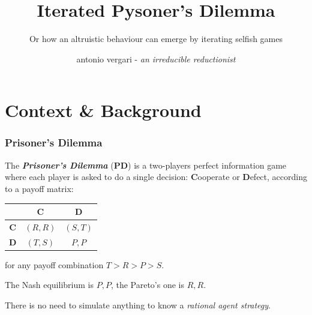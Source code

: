 \documentclass[xcolor={usenames,dvipsnames,svgnames}, compress]{beamer}
\begin{document}
\title{Iterated Pysoner's Dilemma}
\subtitle{Or how an altruistic behaviour can emerge by iterating selfish games}
\author{antonio vergari - \emph{an irreducible reductionist}}

\footnotesize \let\small\footnotesize

{
  \begin{frame}
    \titlepage
  \end{frame}
}

\section{Context \& Background}
{
  \begin{frame}
    \sectionpage
  \end{frame}
}

\begin{frame}
  \frametitle{ Prisoner's Dilemma}
  The \emph{\textbf{Prisoner's Dilemma}} (\textbf{PD}) is a two-players perfect information game where each player is asked to
  do a single decision: \textbf{C}ooperate or \textbf{D}efect,
  according to a payoff matrix:
  \begin{table}[c]
    \centering
    \begin{tabular}[htbp]{c c c}
      & \textbf{C} & \textbf{D} \\
      \midrule
      \textbf{C} & $(R,R)$ & $(S,T)$ \\
      \midrule
      \textbf{D} & $(T,S)$ & $P,P$ \\
      \bottomrule
    \end{tabular}
  \end{table}\par\bigskip

  for any payoff combination $T > R > P > S$.\par\bigskip

  The Nash equilibrium is $P, P$, the Pareto's one is $R,R$.

  There is no need to simulate
  anything to know a \emph{rational agent strategy}.\par\bigskip


\end{frame}
\end{document}
